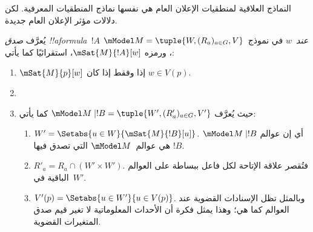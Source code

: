 \documentclass[../../../include/open-logic-section]{subfiles}
\begin{document}


النماذج العلاقية لمنطقيات الإعلان العام هي نفسها نماذج المنطقيات
المعرفية. لكن دلالات مؤثر الإعلان العام جديدة.

\begin{defn} يُعرَّف \emph{صدق !!a{formula}~$!A$
  عند~$w$} في نموذج~$\mModel M = \tuple{W,(R_a)_{a \in G},V}$، ورمزه
  $\mSat{M}{!A}[w]$، استقرائيًا كما يأتي:
  \begin{enumerate}
  \item $\mSat{M}{p}[w]$ إذا وفقط إذا كان $w \in V(p)$.
  \item{}
  \item{}

  
  حيث يُعرَّف $\mModel M \mid !B = \tuple{W',(R'_a)_{a \in G},V'}$ كما يأتي:
  \begin{enumerate}
    \item $W' = \Setabs{ u \in W}{\mSat{M}{!B}[u]}$. أي إن عوالم
      $\mModel M \mid !B$ هي عوالم~$\mModel M$ التي تصدق فيها $!B$.
    \item $R'_a = R_a \cap (W' \times W')$. فتُقصر علاقة الإتاحة لكل
      فاعل ببساطة على العوالم الباقية في~$W'$.
    \item $V'(p) = \Setabs{ u \in W'}{u \in V(p) }$. وبالمثل تظل
      الإسنادات القضوية عند العوالم كما هي؛ وهذا يمثل فكرة أن الأحداث
      المعلوماتية لا تغير قيم صدق المتغيرات القضوية.
  \end{enumerate}
  
  \end{enumerate} 
\end{defn}
\end{document}
